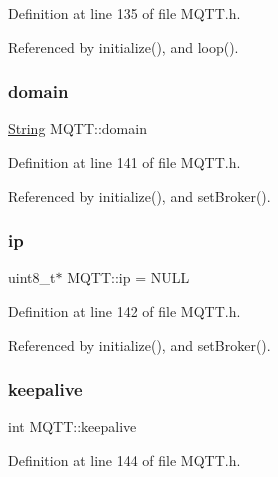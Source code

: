 Definition at line 135 of file M\+Q\+T\+T.\+h.



Referenced by initialize(), and loop().

\mbox{\label{class_m_q_t_t_a36cef0e2c168c4ce68dda653df6e3be1}} 
\subsubsection{\texorpdfstring{domain}{domain}}
{\footnotesize\ttfamily \hyperlink{class_string}{String} M\+Q\+T\+T\+::domain\hspace{0.3cm}{\ttfamily [private]}}



Definition at line 141 of file M\+Q\+T\+T.\+h.



Referenced by initialize(), and set\+Broker().

\mbox{\label{class_m_q_t_t_a70618323bb75b467ed054dd191397b37}} 
\subsubsection{\texorpdfstring{ip}{ip}}
{\footnotesize\ttfamily uint8\+\_\+t$\ast$ M\+Q\+T\+T\+::ip = N\+U\+LL\hspace{0.3cm}{\ttfamily [private]}}



Definition at line 142 of file M\+Q\+T\+T.\+h.



Referenced by initialize(), and set\+Broker().

\mbox{\label{class_m_q_t_t_af93aeb459130c36b2a8d894011f10492}} 
\subsubsection{\texorpdfstring{keepalive}{keepalive}}
{\footnotesize\ttfamily int M\+Q\+T\+T\+::keepalive\hspace{0.3cm}{\ttfamily [private]}}



Definition at line 144 of file M\+Q\+T\+T.\+h.



